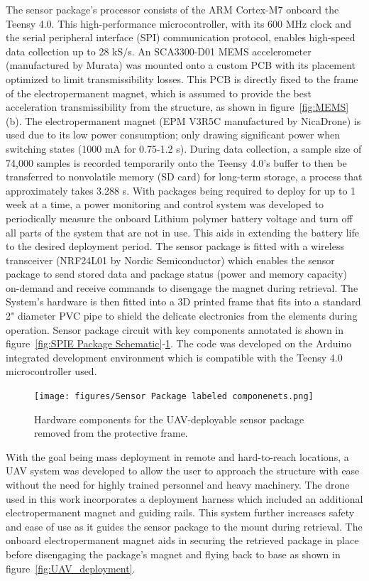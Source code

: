 \documentclass[]{spie}  %
\begin{document}
	The sensor package's processor consists of the ARM Cortex-M7 onboard the Teensy 4.0. This high-performance microcontroller, with its 600 MHz clock and the serial peripheral interface (SPI) communication protocol, enables high-speed data collection up to 28 kS/s. An SCA3300-D01 MEMS accelerometer (manufactured by Murata) was mounted onto a custom PCB with its placement optimized to limit transmissibility losses. This PCB is directly fixed to the frame of the electropermanent magnet, which is assumed to provide the best acceleration transmissibility from the structure, as shown in figure~\ref{fig:MEMS}(b). The electropermanent magnet (EPM V3R5C manufactured by NicaDrone) is used due to its low power consumption; only drawing significant power when switching states (1000 mA for 0.75-1.2 s). During data collection, a sample size of 74,000 samples is recorded temporarily onto the Teensy 4.0's buffer to then be transferred to nonvolatile memory (SD card) for long-term storage, a process that approximately takes 3.288 s. With packages being required to deploy for up to 1 week at a time, a power monitoring and control system was developed to periodically measure the onboard Lithium polymer battery voltage and turn off all parts of the system that are not in use. This aids in extending the battery life to the desired deployment period. The sensor package is fitted with a wireless transceiver (NRF24L01 by Nordic Semiconductor) which enables the sensor package to send stored data and package status (power and memory capacity) on-demand and receive commands to disengage the magnet during retrieval. The System's hardware is then fitted into a 3D printed frame that fits into a standard 2" diameter PVC pipe to shield the delicate electronics from the elements during operation. Sensor package circuit with key components annotated is shown in figure~\ref{fig:SPIE Package Schematic}-\ref{fig:Sensor_Package_labeled_componenets}. The code was developed on the Arduino integrated development environment which is compatible with the Teensy 4.0 microcontroller used.  

	\begin{figure} [H]
	\centering
	\texttt{[image: figures/Sensor Package labeled componenets.png]}
	\caption{Hardware components for the UAV-deployable sensor package removed from the protective frame.}
	\label{fig:Sensor_Package_labeled_componenets}
	\end{figure}

	
	With the goal being mass deployment in remote and hard-to-reach locations, a UAV system was developed to allow the user to approach the structure with ease without the need for highly trained personnel and heavy machinery. The drone used in this work incorporates a deployment harness which included an additional electropermanent magnet and guiding rails. This system further increases safety and ease of use as it guides the sensor package to the mount during retrieval. The onboard electropermanent magnet aids in securing the retrieved package in place before disengaging the package’s magnet and flying back to base as shown in figure~\ref{fig:UAV_deployment}\cite{Carroll2021}.
\end{document}
